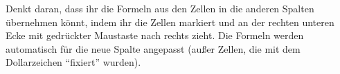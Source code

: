 \documentclass[10pt, a4paper]{arbeitsblatt}
\begin{document}
Denkt daran, dass ihr die Formeln aus den Zellen in die anderen Spalten
übernehmen könnt, indem ihr die Zellen markiert und an der rechten unteren Ecke
mit gedrückter Maustaste nach rechts zieht. Die Formeln werden automatisch für
die neue Spalte angepasst (außer Zellen, die mit dem Dollarzeichen
\enquote{fixiert} wurden).
\end{document}
